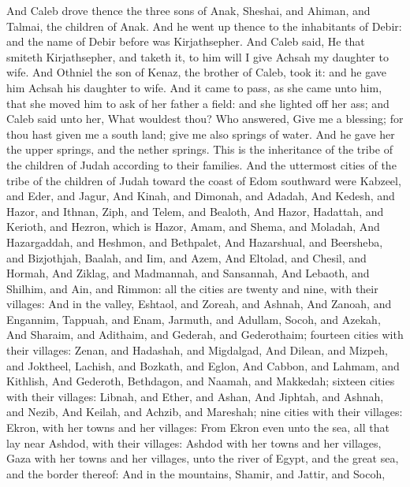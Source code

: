 \begin{biblechapter}
\verse And Caleb drove thence the three sons of Anak, Sheshai, and Ahiman, and Talmai, the children of Anak.
\verse And he went up thence to the inhabitants of Debir: and the name of Debir before was Kirjathsepher.
\verse And Caleb said, He that smiteth Kirjathsepher, and taketh it, to him will I give Achsah my daughter to wife.
\verse And Othniel the son of Kenaz, the brother of Caleb, took it: and he gave him Achsah his daughter to wife.
\verse And it came to pass, as she came unto him, that she moved him to ask of her father a field: and she lighted off her ass; and Caleb said unto her, What wouldest thou?
\verse Who answered, Give me a blessing; for thou hast given me a south land; give me also springs of water. And he gave her the upper springs, and the nether springs.
\verse This is the inheritance of the tribe of the children of Judah according to their families.
\verse And the uttermost cities of the tribe of the children of Judah toward the coast of Edom southward were Kabzeel, and Eder, and Jagur,
\verse And Kinah, and Dimonah, and Adadah,
\verse And Kedesh, and Hazor, and Ithnan,
\verse Ziph, and Telem, and Bealoth,
\verse And Hazor, Hadattah, and Kerioth, and Hezron, which is Hazor,
\verse Amam, and Shema, and Moladah,
\verse And Hazargaddah, and Heshmon, and Bethpalet,
\verse And Hazarshual, and Beersheba, and Bizjothjah,
\verse Baalah, and Iim, and Azem,
\verse And Eltolad, and Chesil, and Hormah,
\verse And Ziklag, and Madmannah, and Sansannah,
\verse And Lebaoth, and Shilhim, and Ain, and Rimmon: all the cities are twenty and nine, with their villages:
\verse And in the valley, Eshtaol, and Zoreah, and Ashnah,
\verse And Zanoah, and Engannim, Tappuah, and Enam,
\verse Jarmuth, and Adullam, Socoh, and Azekah,
\verse And Sharaim, and Adithaim, and Gederah, and Gederothaim; fourteen cities with their villages:
\verse Zenan, and Hadashah, and Migdalgad,
\verse And Dilean, and Mizpeh, and Joktheel,
\verse Lachish, and Bozkath, and Eglon,
\verse And Cabbon, and Lahmam, and Kithlish,
\verse And Gederoth, Bethdagon, and Naamah, and Makkedah; sixteen cities with their villages:
\verse Libnah, and Ether, and Ashan,
\verse And Jiphtah, and Ashnah, and Nezib,
\verse And Keilah, and Achzib, and Mareshah; nine cities with their villages:
\verse Ekron, with her towns and her villages:
\verse From Ekron even unto the sea, all that lay near Ashdod, with their villages:
\verse Ashdod with her towns and her villages, Gaza with her towns and her villages, unto the river of Egypt, and the great sea, and the border thereof:
\verse And in the mountains, Shamir, and Jattir, and Socoh,

\end{biblechapter}
